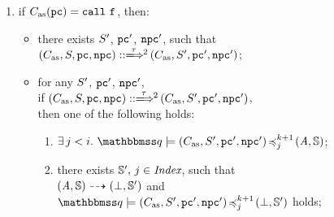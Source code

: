 \begin{definition}
\begin{enumerate}[1.]
        \item if {\em $\asmimp(\pc) = \call \ \lab{}$}, then:
            \begin{itemize}
                \item there exists {\em $S'$}, {\em $\texttt{pc}'$}, {\em $\texttt{npc}'$},
                 such that \\
                    {\em $\LGlobMultiTrans{(\asmimp, \state, \pc, \npc)}
                            {\empmsg\,}{2}{(\asmimp, \state', \pc', \npc')}$};
                \item for any {\em $S'$}, {\em $\texttt{pc}'$}, {\em $\texttt{npc}'$}, \\ if
                {\em $\LGlobMultiTrans{(\asmimp, \state, \pc, \npc)}{\empmsg\,}
                        {2}{(\asmimp, \state', \pc', \npc')}$}, \\
                    then one of the following holds:
                \begin{enumerate}
                    \item {\em $\exists \, j < i. \
                        \simFunctionSt{\relastQ}{(\asmimp, \state', \pc', \npc')}
                            {j}{k+1}{(\primcom, \hpstate)}$};
                    \item there exists $\mathbb{S}', \, j \in \textit{Index}$,
                        such that \\
                        ${(\textit{A}, \mathbb{S})} \dashrightarrow {(\perp, \mathbb{S}')}$
                        and \\
                        {\em $\simFunctionSt{\relastQ}{(\asmimp, \state', \pc', \npc')}
                                {j}{k+1}{(\primdone, \hpstate')}$} holds;
                \end{enumerate}
            \end{itemize}
            \vspace{0.5em}


\end{enumerate}
\end{definition}
